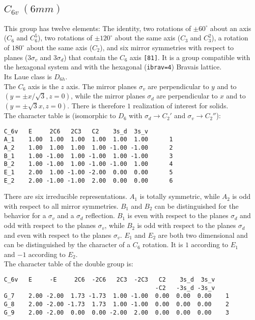 \documentclass[12pt,a4paper]{article}
\begin{document}
\subsection{\color{web-blue}$C_{6v}\ (6mm)$} 
This group has twelve elements: The identity, two rotations of $\pm60^\circ$ 
about an axis ($C_6$ and $C_6^5$), two rotations of $\pm120^\circ$
about the same axis ($C_3$ and $C_3^2$), a rotation of $180^\circ$ about 
the same axis ($C_2$), and six mirror symmetries with respect to
planes ($3\sigma_v$ and $3\sigma_d$) that contain the $C_6$ axis \texttt{[81]}.
It is a group compatible with the hexagonal system and with the  
hexagonal (\texttt{ibrav=4}) Bravais lattice. \\ 
Its Laue class is $D_{6h}$. \\
The $C_6$ axis is the $z$ axis. The mirror planes $\sigma_v$ are perpendicular 
to $y$ and to $(y=\pm x/\sqrt{3}, z=0)$, while the mirror planes $\sigma_d$
are perpendicular to $x$ and to $(y=\pm \sqrt{3} x, z=0)$.
There is therefore $1$ realization of interest for solids. \\
The character table is (isomorphic to $D_6$ with $\sigma_d \rightarrow C_2'$
and $\sigma_v \rightarrow C_2''$):
\begin{verbatim}
C_6v   E     2C6   2C3   C2    3s_d  3s_v 
A_1    1.00  1.00  1.00  1.00  1.00  1.00      1
A_2    1.00  1.00  1.00  1.00 -1.00 -1.00      2
B_1    1.00 -1.00  1.00 -1.00  1.00 -1.00      3
B_2    1.00 -1.00  1.00 -1.00 -1.00  1.00      4
E_1    2.00  1.00 -1.00 -2.00  0.00  0.00      5
E_2    2.00 -1.00 -1.00  2.00  0.00  0.00      6
\end{verbatim}
There are six irreducible representations. $A_1$ is totally symmetric, while
$A_2$ is odd with respect to all mirror symmetries. $B_1$ and $B_2$ can be
distinguished for the behavior for a $\sigma_v$ and a
$\sigma_d$ reflection. $B_1$ is even with respect to the planes $\sigma_d$
and odd with respect to the planes $\sigma_v$, while $B_2$ is odd with
respect to the planes $\sigma_d$ and even with respect to the planes 
$\sigma_v$. $E_1$ and $E_2$ are both two dimensional and can be 
distinguished by the character of a $C_6$ rotation. It is
$1$ according to $E_1$ and $-1$ according to $E_2$.\\
The character table of the double group is:
\begin{verbatim}
C_6v   E     -E     2C6  -2C6   2C3  -2C3   C2    3s_d  3s_v
                                           -C2   -3s_d -3s_v
G_7    2.00 -2.00  1.73 -1.73  1.00 -1.00  0.00  0.00  0.00    1
G_8    2.00 -2.00 -1.73  1.73  1.00 -1.00  0.00  0.00  0.00    2
G_9    2.00 -2.00  0.00  0.00 -2.00  2.00  0.00  0.00  0.00    3
\end{verbatim}
\end{document}
